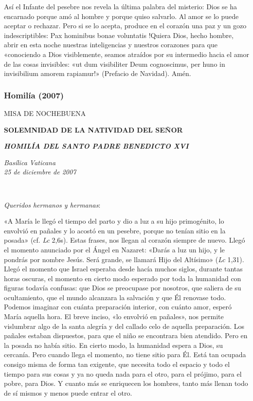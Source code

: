 Así el Infante del pesebre nos revela la última palabra del misterio:
Dios se ha encarnado porque amó al hombre y porque quiso salvarlo. Al
amor se lo puede aceptar o rechazar. Pero si se lo acepta, produce en el
corazón una paz y un gozo indescriptibles: Pax hominibus bonae
voluntatis !Quiera Dios, hecho hombre, abrir en esta noche nuestras
inteligencias y nuestros corazones para que «conociendo a Dios
visiblemente, seamos atraídos por su intermedio hacia el amor de las
cosas invisibles: «ut dum visibiliter Deum cognoscimus, per huno in
invisibilium amorem rapiamur!» (Prefacio de Navidad). Amén.

\subsubsection{Homilía (2007)}

MISA DE NOCHEBUENA

\textbf{SOLEMNIDAD DE LA NATIVIDAD DEL SEÑOR}

\textbf{\emph{HOMILÍA DEL SANTO PADRE BENEDICTO XVI}}

\emph{Basílica Vaticana\\
	25 de diciembre de 2007}

~

\emph{Queridos hermanos y hermanas}:

«A María le llegó el tiempo del parto y dio a luz a su hijo primogénito,
lo envolvió en pañales y lo acostó en un pesebre, porque no tenían sitio
en la posada» (cf. \emph{Lc} 2,6s). Estas frases, nos llegan al corazón
siempre de nuevo. Llegó el momento anunciado por el Ángel en Nazaret:
«Darás a luz un hijo, y le pondrás por nombre Jesús. Será grande, se
llamará Hijo del Altísimo» (\emph{Lc} 1,31). Llegó el momento que Israel
esperaba desde hacía muchos siglos, durante tantas horas oscuras, el
momento en cierto modo esperado por toda la humanidad con figuras
todavía confusas: que Dios se preocupase por nosotros, que saliera de su
ocultamiento, que el mundo alcanzara la salvación y que Él renovase
todo. Podemos imaginar con cuánta preparación interior, con cuánto amor,
esperó María aquella hora. El breve inciso, «lo envolvió en pañales»,
nos permite vislumbrar algo de la santa alegría y del callado celo de
aquella preparación. Los pañales estaban dispuestos, para que el niño se
encontrara bien atendido. Pero en la posada no había sitio. En cierto
modo, la humanidad espera a Dios, su cercanía. Pero cuando llega el
momento, no tiene sitio para Él. Está tan ocupada consigo misma de forma
tan exigente, que necesita todo el espacio y todo el tiempo para sus
cosas y ya no queda nada para el otro, para el prójimo, para el pobre,
para Dios. Y cuanto más se enriquecen los hombres, tanto más llenan todo
de sí mismos y menos puede entrar el otro.

